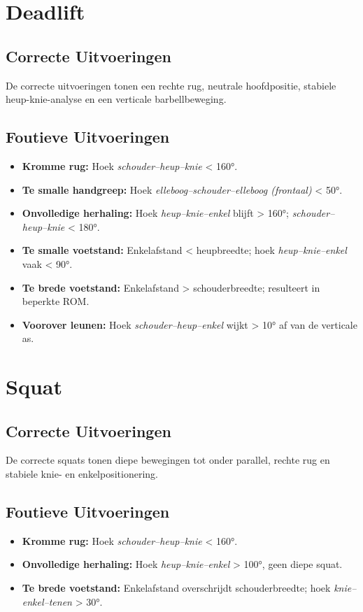 \section{Deadlift}
\subsection{Correcte Uitvoeringen}
De correcte uitvoeringen tonen een rechte rug, neutrale hoofdpositie, stabiele heup-knie-analyse en een verticale barbellbeweging.

\subsection{Foutieve Uitvoeringen}
\begin{itemize}
    \item \textbf{Kromme rug:} Hoek \textit{schouder–heup–knie} < 160°.
    
    \item \textbf{Te smalle handgreep:} Hoek \textit{elleboog–schouder–elleboog (frontaal)} < 50°.
    
    \item \textbf{Onvolledige herhaling:} Hoek \textit{heup–knie–enkel} blijft > 160°; \textit{schouder–heup–knie} < 180°.
    
    \item \textbf{Te smalle voetstand:} Enkelafstand < heupbreedte; hoek \textit{heup–knie–enkel} vaak < 90°.
    
    \item \textbf{Te brede voetstand:} Enkelafstand > schouderbreedte; resulteert in beperkte ROM.
    
    \item \textbf{Voorover leunen:} Hoek \textit{schouder–heup–enkel} wijkt > 10° af van de verticale as.
\end{itemize}



\section{Squat}
\subsection{Correcte Uitvoeringen}
De correcte squats tonen diepe bewegingen tot onder parallel, rechte rug en stabiele knie- en enkelpositionering.

\subsection{Foutieve Uitvoeringen}
\begin{itemize}
    \item \textbf{Kromme rug:} Hoek \textit{schouder–heup–knie} < 160°.    
    \item \textbf{Onvolledige herhaling:} Hoek \textit{heup–knie–enkel} > 100°, geen diepe squat.    
    \item \textbf{Te brede voetstand:} Enkelafstand overschrijdt schouderbreedte; hoek \textit{knie–enkel–tenen} > 30°.
\end{itemize}


